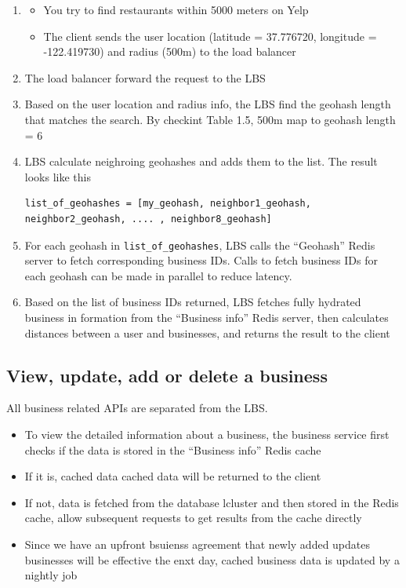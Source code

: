 \documentclass{report}
\theoremstyle{definition}
\let\oldsubsection\subsection
\renewcommand{\subsection}{\oldsubsection*}
\begin{document}
\begin{enumerate}
\item
\begin{itemize}
\item
You try to find restaurants within 5000 meters on Yelp
\item
The client sends the user location (latitude = 37.776720, longitude = -122.419730) and radius (500m) to the load balancer
\end{itemize}
\item
The load balancer forward the request to the LBS
\item
Based on the user location and radius info, the LBS find the geohash length that matches the search. By checkint Table 1.5, 500m map to geohash length = 6
\item
LBS calculate neighroing geohashes and adds them to the list. The result looks like this

\begin{lstlisting}
list_of_geohashes = [my_geohash, neighbor1_geohash, neighbor2_geohash, .... , neighbor8_geohash]
\end{lstlisting}

\item
For each geohash in \lstinline|list_of_geohashes|, LBS calls the ``Geohash'' Redis server to fetch corresponding business IDs. Calls to fetch business IDs for each geohash can be made in parallel to reduce latency.

\item
Based on the list of business IDs returned, LBS fetches fully hydrated business in formation from the ``Business info'' Redis server, then calculates distances between a user and businesses, and returns the result to the client
\end{enumerate}

\subsection{View, update, add or delete a business}

All business related APIs are separated from the LBS.

\begin{itemize}
\item
To view the detailed information about a business, the business service first checks if the data is stored in the ``Business info'' Redis cache
\item
If it is, cached data cached data will be returned to the client
\item
If not, data is fetched from the database lcluster and then stored in the Redis cache, allow subsequent requests to get results from the cache directly
\item
Since we have an upfront bsuienss agreement that newly added updates businesses will be effective the enxt day, cached business data is updated by a nightly job
\end{itemize}
\end{document}
